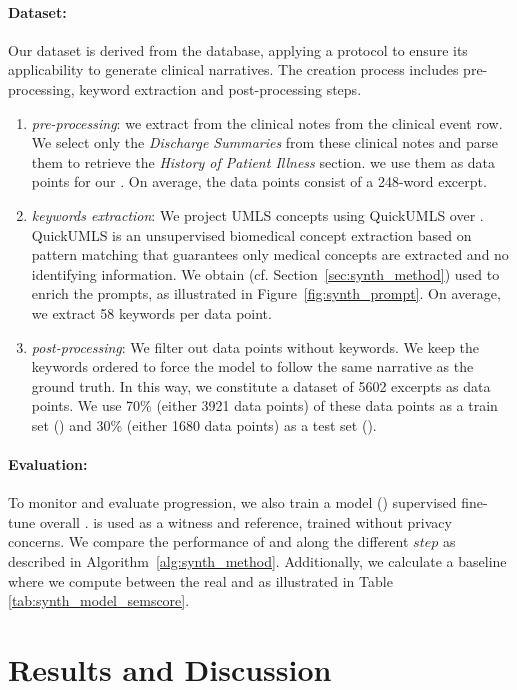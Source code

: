 \paragraph{Dataset:}
Our dataset is derived from the \mimic database, applying a protocol to ensure its applicability to generate clinical narratives. The creation process includes pre-processing, keyword extraction and post-processing steps.
\begin{enumerate}
    \item \textit{pre-processing}: we extract from \mimic the clinical notes from the clinical event row. We select only the \textit{Discharge Summaries} from these clinical notes and parse them to retrieve the \textit{History of Patient Illness} section. we use them as data points for our \dtr. On average, the data points consist of a 248-word excerpt.
    \item \textit{keywords extraction}: We project UMLS concepts using QuickUMLS over \dtr. QuickUMLS is an unsupervised biomedical concept extraction based on pattern matching that guarantees only medical concepts are extracted and no identifying information. We obtain \ktr (cf. Section~\ref{sec:synth_method}) used to enrich the prompts, as illustrated in Figure~\ref{fig:synth_prompt}. On average, we extract 58 keywords per data point.  
    \item \textit{post-processing}: We filter out data points without keywords. We keep the keywords ordered to force the model to follow the same narrative as the ground truth.
    In this way, we constitute a dataset of 5602 excerpts as data points. We use 70\% (either 3921 data points) of these data points as a train set (\dtr) and 30\% (either 1680 data points) as a test set (\dte).
\end{enumerate}

\paragraph{Evaluation:}
To monitor and evaluate \mg progression, we also train a model (\mref) supervised fine-tune overall \dtr. \mref is used as a witness and reference, trained without privacy concerns. We compare the performance of \mg and \mref along the different $step$ as described in Algorithm~\ref{alg:synth_method}. Additionally, we calculate a baseline where we compute \score between the real \dte and \kte as illustrated in Table \ref{tab:synth_model_semscore}.

\section{Results and Discussion}

